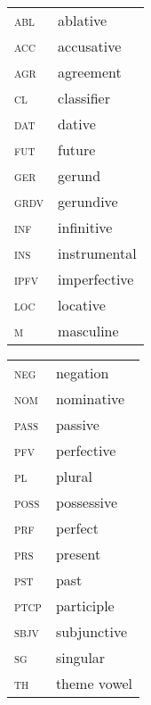 \documentclass[output=paper,colorlinks,citecolor=brown]{langscibook}
\begin{document}
\begin{tabularx}{.5\textwidth}{@{}lQ}
\textsc{abl}&ablative\\
\textsc{acc}&accusative\\
\textsc{agr}&agreement\\
\textsc{cl}&classifier\\
\textsc{dat}&dative\\
\textsc{fut}&future\\
\textsc{ger}&gerund\\
\textsc{grdv}&gerundive\\
\textsc{inf}&infinitive\\
\textsc{ins}&instrumental\\
\textsc{ipfv}&imperfective\\
\textsc{loc}&locative\\
\textsc{m}&masculine\\
\end{tabularx}%
\begin{tabularx}{.5\textwidth}{lQ@{}}
\textsc{neg}&negation\\
\textsc{nom}&nominative\\
\textsc{pass}&passive\\
\textsc{pfv}&perfective\\
\textsc{pl}&plural\\
\textsc{poss}&possessive\\
\textsc{prf}&perfect\\
\textsc{prs}&present\\
\textsc{pst}&past\\
\textsc{ptcp}&participle\\
\textsc{sbjv}&subjunctive\\
\textsc{sg}&singular\\
\textsc{th}&theme vowel\\
\end{tabularx}
\end{document}
